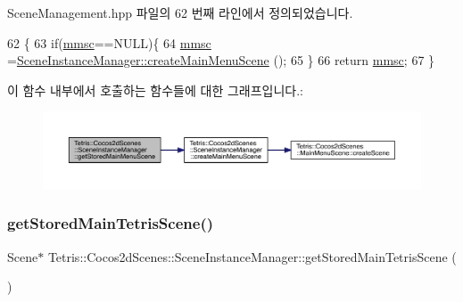 Scene\+Management.\+hpp 파일의 62 번째 라인에서 정의되었습니다.


\begin{DoxyCode}
62                                        \{
63             \textcolor{keywordflow}{if}(\hyperlink{class_tetris_1_1_cocos2d_scenes_1_1_scene_instance_manager_aed6486f09ebd0506636943d3355de167}{mmsc}==NULL)\{
64                 \hyperlink{class_tetris_1_1_cocos2d_scenes_1_1_scene_instance_manager_aed6486f09ebd0506636943d3355de167}{mmsc} =\hyperlink{class_tetris_1_1_cocos2d_scenes_1_1_scene_instance_manager_a7dad1373db969d5c882e2cdc46f7933a}{SceneInstanceManager::createMainMenuScene}
      ();
65             \}
66             \textcolor{keywordflow}{return} \hyperlink{class_tetris_1_1_cocos2d_scenes_1_1_scene_instance_manager_aed6486f09ebd0506636943d3355de167}{mmsc};
67         \}
\end{DoxyCode}
이 함수 내부에서 호출하는 함수들에 대한 그래프입니다.\+:
\nopagebreak
\begin{figure}[H]
\begin{center}
\leavevmode
\includegraphics[width=350pt]{d1/d6f/class_tetris_1_1_cocos2d_scenes_1_1_scene_instance_manager_ac7f573b16a4fd8746fd1f397dbfd01c2_cgraph}
\end{center}
\end{figure}
\mbox{\label{class_tetris_1_1_cocos2d_scenes_1_1_scene_instance_manager_af79d0ad920411ed2b87545b49bc32e6c}} 
\subsubsection{\texorpdfstring{get\+Stored\+Main\+Tetris\+Scene()}{getStoredMainTetrisScene()}}
{\footnotesize\ttfamily Scene$\ast$ Tetris\+::\+Cocos2d\+Scenes\+::\+Scene\+Instance\+Manager\+::get\+Stored\+Main\+Tetris\+Scene (\begin{DoxyParamCaption}{ }\end{DoxyParamCaption})\hspace{0.3cm}{\ttfamily [inline]}}

